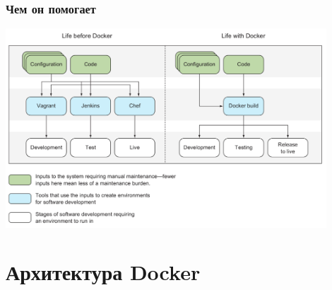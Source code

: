 \documentclass[xetex,mathserif,serif]{beamer}
\begin{document}
    \begin{frame}
        \frametitle{Чем он помогает}
        \begin{center}
            \includegraphics[width=0.9\textwidth]{withAndWithoutDocker.png}
        \end{center}
    \end{frame}

    \section{Архитектура Docker}
\end{document}
